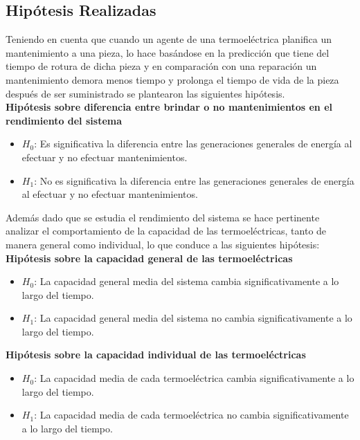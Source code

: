 \documentclass[twocolumn, fontsize=10pt]{article}
\begin{document}
\subsection{Hipótesis Realizadas}

Teniendo en cuenta que cuando un agente de una termoeléctrica planifica un mantenimiento a una pieza, lo hace basándose en la predicción que tiene del
tiempo de rotura de dicha pieza y en comparación con una reparación un mantenimiento demora menos tiempo y prolonga el tiempo de vida de la pieza después
de ser suministrado se plantearon las siguientes hipótesis.\\

\textbf{Hipótesis sobre diferencia entre brindar o no mantenimientos en el rendimiento del sistema}
\begin{itemize}
  \item \textbf{$H_0$}: Es significativa la diferencia entre las generaciones generales de energía al efectuar y no efectuar mantenimientos.
  \item \textbf{$H_1$}: No es significativa la diferencia entre las generaciones generales de energía al efectuar y no efectuar mantenimientos.
\end{itemize}

Además dado que se estudia el rendimiento del sistema se hace pertinente analizar el
comportamiento de la capacidad de las termoeléctricas, tanto de manera general como individual,
lo que conduce a las siguientes hipótesis:\\

\textbf{Hipótesis sobre la capacidad general de las termoeléctricas}

\begin{itemize}
  \item \textbf{$H_0$}: La capacidad general media del sistema cambia significativamente a lo largo del tiempo.
  \item \textbf{$H_1$}: La capacidad general media del sistema no cambia significativamente a lo largo del tiempo.
\end{itemize}

\textbf{Hipótesis sobre la capacidad individual de las termoeléctricas}


\begin{itemize}
  \item \textbf{$H_0$}: La capacidad media de cada termoeléctrica cambia significativamente a lo largo del tiempo.
  \item \textbf{$H_1$}: La capacidad media de cada termoeléctrica no cambia significativamente a lo largo del tiempo.
\end{itemize}
\end{document}

